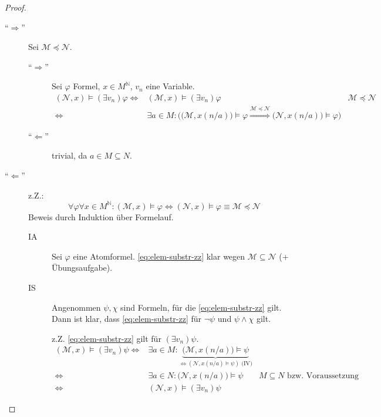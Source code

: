 \documentclass{article}
\theoremstyle{definition}
\theoremstyle{plain}
\newcommand{\m}[1]{\mathcal{#1}}
\begin{document}
    \begin{proof}
        ~\par
        \begin{description}
            \item[``$ \Rightarrow $''] Sei $ \m{M} \preceq \m{N} $.
            \begin{description}
                \item[``$ \Rightarrow $'']
                Sei $ \varphi $ Formel, $ x \in M^\mathbb{N} $, $ v_n $ eine Variable.
                \begin{align*}
                    (\m{N}, x) \models (\exists v_n) \varphi \Leftrightarrow & (\m{M}, x) \models (\exists v_n) \varphi & \m{M} \preceq \m{N} \\
                    \Leftrightarrow & \exists a \in M: \bigg( \big(\m{M}, x(n/a)\big) \models \varphi \stackrel{\m{M} \preceq \m{N}}{\Rightarrow} \big(\m{N}, x(n/a)\big) \models \varphi \bigg)
                \end{align*}
                \item[``$ \Leftarrow $''] trivial, da $ a \in M \subseteq N $.
            \end{description}
            \item[``$ \Leftarrow $''] z.Z.:
            \begin{equation}
                \label{eq:elem-substr-zz}
                \forall \varphi \forall x \in M^\mathbb{N}: (\m{M}, x) \models \varphi \Leftrightarrow (\m{N}, x) \models \varphi \equiv \m{M} \preceq \m{N}
            \end{equation}
            Beweis durch Induktion über Formelauf.

            \begin{description}
                \item[IA] Sei $ \varphi $ eine Atomformel. \eqref{eq:elem-substr-zz} klar wegen $ \m{M} \subseteq \m{N} $ (+ Übungsaufgabe).

                \item[IS] Angenommen $ \psi, \chi $ sind Formeln, für die \eqref{eq:elem-substr-zz} gilt.
                Dann ist klar, dass \eqref{eq:elem-substr-zz} für $ \neg \psi $ und $ \psi \land \chi $ gilt.

                z.Z. \eqref{eq:elem-substr-zz} gilt für $ (\exists v_n) \psi $.
                \begin{align*}
                    (\m{M}, x) \models (\exists v_n) \psi \Leftrightarrow & \exists a \in M: \underbrace{\big(\m{M}, x(n/a)\big) \models \psi}_{\Leftrightarrow (\m{N}, x(n/a) \models \psi) \text{ (IV)}} \\
                    \Leftrightarrow & \exists a \in N: \big(\m{N}, x(n/a)\big) \models \psi & M \subseteq N \text{ bzw. Voraussetzung} \\
                    \Leftrightarrow & (\m{N}, x) \models (\exists v_n) \psi
                \end{align*}
            \end{description}
        \end{description}
    \end{proof}
\end{document}
